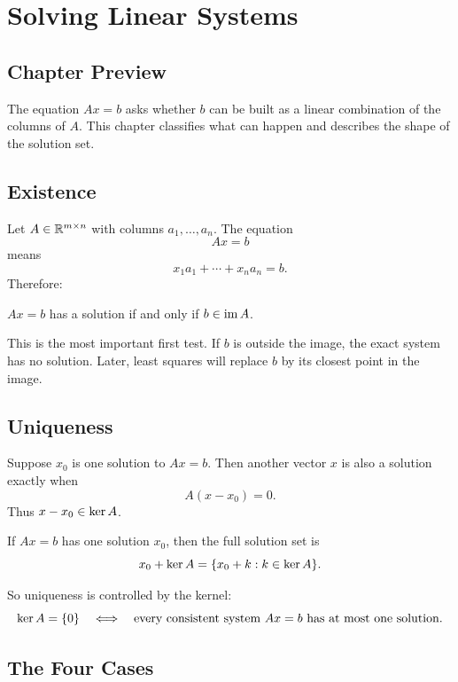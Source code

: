 \chapter{Solving Linear Systems}
\label{ch:solving-linear-systems}

\section*{Chapter Preview}

The equation $Ax=b$ asks whether $b$ can be built as a linear combination of
the columns of $A$. This chapter classifies what can happen and describes the
shape of the solution set.

\section{Existence}

Let $A\in\mathbb{R}^{m\times n}$ with columns $a_1,\ldots,a_n$. The equation
\[
  Ax=b
\]
means
\[
  x_1a_1+\cdots+x_na_n=b.
\]
Therefore:

\begin{proposition}
$Ax=b$ has a solution if and only if $b\in\operatorname{im} A$.
\end{proposition}

This is the most important first test. If $b$ is outside the image, the exact
system has no solution. Later, least squares will replace $b$ by its closest
point in the image.

\section{Uniqueness}

Suppose $x_0$ is one solution to $Ax=b$. Then another vector $x$ is also a
solution exactly when
\[
  A(x-x_0)=0.
\]
Thus $x-x_0\in\operatorname{ker} A$.

\begin{theorem}
If $Ax=b$ has one solution $x_0$, then the full solution set is
\[
  x_0+\operatorname{ker} A=\{x_0+k:k\in\operatorname{ker} A\}.
\]
\end{theorem}

So uniqueness is controlled by the kernel:
\[
  \operatorname{ker} A=\{0\}
  \quad\Longleftrightarrow\quad
  \text{every consistent system }Ax=b\text{ has at most one solution.}
\]

\section{The Four Cases}

